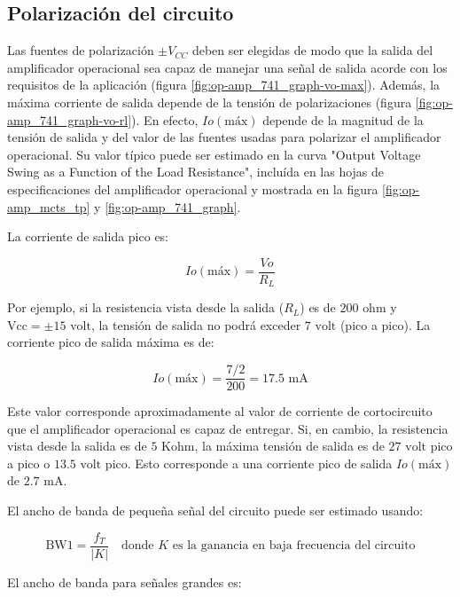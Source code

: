 \subsection{Polarización del circuito}
Las fuentes de polarización $\pm V_{CC}$ deben ser elegidas de modo que la salida del amplificador operacional sea capaz de manejar una señal de salida acorde con los requisitos de la aplicación (figura \ref{fig:op-amp_741_graph-vo-max}). Además, la máxima corriente de salida depende de la tensión de polarizaciones (figura \ref{fig:op-amp_741_graph-vo-rl}). En efecto, $Io(\text{máx})$ depende de la magnitud de la tensión de salida y del valor de las fuentes usadas para polarizar el amplificador operacional. Su valor típico puede ser estimado en la curva "Output Voltage Swing as a Function of the Load Resistance", incluída en las hojas de especificaciones del amplificador operacional y mostrada en la figura \ref{fig:op-amp_mcts_tp} y \ref{fig:op-amp_741_graph}.

La corriente de salida pico es:

\begin{equation}
	Io(\text{máx}) = \frac{Vo}{R_L}
\end{equation}

Por ejemplo, si la resistencia vista desde la salida ($R_L$) es de $200\text{ ohm}$ y $\text{Vcc} = \pm 15\text{ volt}$, la tensión de salida no podrá exceder $7\text{ volt}$ (pico a pico). La corriente pico de salida máxima es de:

\begin{equation}
	Io(\text{máx}) = \frac{7/2}{200} = 17.5\text{ mA}
\end{equation}

Este valor corresponde aproximadamente al valor de corriente de cortocircuito que el amplificador operacional es capaz de entregar. Si, en cambio, la resistencia vista desde la salida es de $5\text{ Kohm}$, la máxima tensión de salida es de $27\text{ volt}$ pico a pico o $13.5\text{ volt}$ pico. Esto corresponde a una corriente pico de salida $Io(\text{máx})$ de $2.7\text{ mA}$.

El ancho de banda de pequeña señal del circuito puede ser estimado usando:

\begin{equation}
	\text{BW1} = \frac{f_T}{|K|} \quad \text{donde } K \text{ es la ganancia en baja frecuencia del circuito}
\end{equation}

El ancho de banda para señales grandes es:

